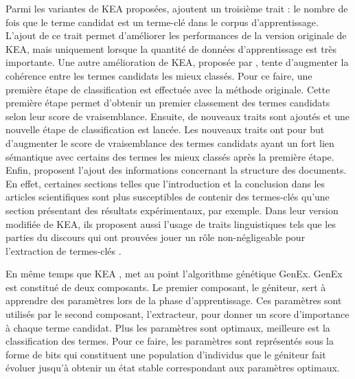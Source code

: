     Parmi les variantes de KEA proposées, \citet{frank1999keafrequency} ajoutent
    un troisième trait : le nombre de fois que le terme candidat est un
    terme-clé dans le corpus d'apprentissage. L'ajout de ce trait permet
    d'améliorer les performances de la version originale de KEA, mais uniquement
    lorsque la quantité de données d'apprentissage est très importante. Une
    autre amélioration de KEA, proposée par \citet{turney2003keacoherence},
    tente d'augmenter la cohérence entre les termes candidats les mieux classés.
    Pour ce faire, une première étape de classification est effectuée avec la
    méthode originale. Cette première étape permet d'obtenir un premier
    classement des termes candidats selon leur score de vraisemblance. Ensuite,
    de nouveaux traits sont ajoutés et une nouvelle étape de classification est
    lancée. Les nouveaux traits ont pour but d'augmenter le score de
    vraisemblance des termes candidats ayant un fort lien sémantique avec
    certains des termes les mieux classés après la première étape. Enfin,
    \citet{nguyen2007keadocumentstructure} proposent l'ajout des informations
    concernant la structure des documents. En effet, certaines sections telles
    que l'introduction et la conclusion dans les articles scientifiques sont
    plus susceptibles de contenir des termes-clés qu'une section présentant des
    résultats expérimentaux, par exemple. Dans leur version modifiée de KEA, ils
    proposent aussi l'usage de traits linguistiques tels que les parties du
    discours qui ont prouvées jouer un rôle non-négligeable pour l'extraction de
    termes-clés \citep{hulth2003keywordextraction}.
    
    En même temps que KEA \citep{witten1999kea},
    \citet{turney1999learningalgorithms} met au point l'algorithme génétique
    GenEx. GenEx est constitué de deux composants. Le premier composant, le
    géniteur, sert à apprendre des paramètres lors de la phase d'apprentissage.
    Ces paramètres sont utilisés par le second composant, l'extracteur, pour
    donner un score d'importance à chaque terme candidat. Plus les paramètres
    sont optimaux, meilleure est la classification des termes. Pour ce faire,
    les paramètres sont représentés sous la forme de bits qui constituent une
    population d'individus que le géniteur fait évoluer jusqu'à obtenir un état
    stable correspondant aux paramètres optimaux.

